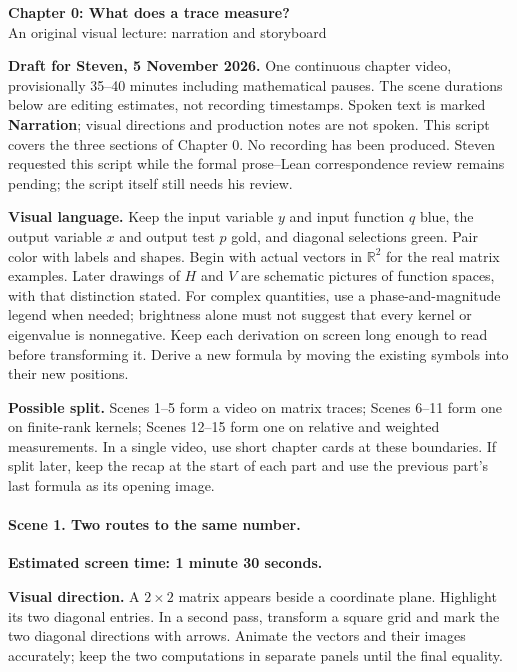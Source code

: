 \begin{center}
\textbf{Chapter 0: What does a trace measure?}\\
An original visual lecture: narration and storyboard
\end{center}

\textbf{Draft for Steven, 5 November 2026.} One continuous chapter video, provisionally 35--40 minutes including mathematical pauses. The scene durations below are editing estimates, not recording timestamps. Spoken text is marked \textbf{Narration}; visual directions and production notes are not spoken. This script covers the three sections of Chapter 0. No recording has been produced. Steven requested this script while the formal prose--Lean correspondence review remains pending; the script itself still needs his review.

\textbf{Visual language.} Keep the input variable $y$ and input function $q$ blue, the output variable $x$ and output test $p$ gold, and diagonal selections green. Pair color with labels and shapes. Begin with actual vectors in $\mathbb R^2$ for the real matrix examples. Later drawings of $H$ and $V$ are schematic pictures of function spaces, with that distinction stated. For complex quantities, use a phase-and-magnitude legend when needed; brightness alone must not suggest that every kernel or eigenvalue is nonnegative. Keep each derivation on screen long enough to read before transforming it. Derive a new formula by moving the existing symbols into their new positions.

\textbf{Possible split.} Scenes 1--5 form a video on matrix traces; Scenes 6--11 form one on finite-rank kernels; Scenes 12--15 form one on relative and weighted measurements. In a single video, use short chapter cards at these boundaries. If split later, keep the recap at the start of each part and use the previous part's last formula as its opening image.

\paragraph{Scene 1. Two routes to the same number.}
\textbf{Estimated screen time: 1 minute 30 seconds.}

\textbf{Visual direction.} A $2\times2$ matrix appears beside a coordinate plane. Highlight its two diagonal entries. In a second pass, transform a square grid and mark the two diagonal directions with arrows. Animate the vectors and their images accurately; keep the two computations in separate panels until the final equality.

